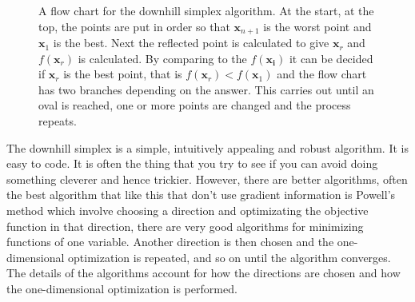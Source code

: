 \documentclass[12pt]{article}
\begin{document}
\begin{figure}
\begin{center}
\end{center}
\caption{A flow chart for the downhill simplex algorithm. At the
  start, at the top, the points are put in order so that
  $\mathbf{x}_{n+1}$ is the worst point and $\mathbf{x}_1$ is the
  best. Next the reflected point is calculated to give $\mathbf{x}_r$
  and $f(\mathbf{x}_r)$ is calculated. By comparing to the
  $f(\mathbf{x_i})$ it can be decided if $\mathbf{x}_r$ is the best
  point, that is $f(\mathbf{x}_r)<f(\mathbf{x}_1)$ and the flow chart
  has two branches depending on the answer. This carries out until an
  oval is reached, one or more points are changed and the process
  repeats.\label{fig:flowchart}}
\end{figure}

The downhill simplex is a simple, intuitively appealing and robust
algorithm. It is easy to code. It is often the thing that you try to
see if you can avoid doing something cleverer and hence
trickier. However, there are better algorithms, often the best
algorithm that like this that don't use gradient information is
Powell's method which involve choosing a direction and optimizating
the objective function in that direction, there are very good
algorithms for minimizing functions of one variable. Another direction
is then chosen and the one-dimensional optimization is repeated, and
so on until the algorithm converges. The details of the algorithms
account for how the directions are chosen and how the one-dimensional
optimization is performed.
\end{document}
